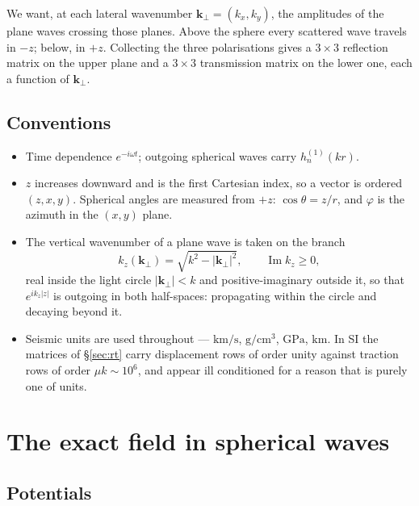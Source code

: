 \documentclass[11pt,a4paper]{article}
\newcommand{\bk}{\mathbf{k}}
\newcommand{\kperp}{\bk_\perp}
\begin{document}
We want, at each lateral wavenumber $\kperp = (k_x,k_y)$, the amplitudes of the
plane waves crossing those planes.  Above the sphere every scattered wave
travels in $-z$; below, in $+z$.  Collecting the three polarisations gives a
$3\times3$ reflection matrix on the upper plane and a $3\times3$ transmission
matrix on the lower one, each a function of $\kperp$.

\subsection{Conventions}\label{sec:conv}

\begin{itemize}
\item Time dependence $e^{-i\omega t}$; outgoing spherical waves carry
      $h_n^{(1)}(kr)$.
\item $z$ increases downward and is the first Cartesian index, so a vector is
      ordered $(z,x,y)$.  Spherical angles are measured from $+z$:
      $\cos\theta = z/r$, and $\varphi$ is the azimuth in the $(x,y)$ plane.
\item The vertical wavenumber of a plane wave is taken on the branch
      \begin{equation}\label{eq:branch}
        k_z(\kperp) = \sqrt{k^2 - |\kperp|^2}, \qquad \operatorname{Im}k_z \ge 0,
      \end{equation}
      real inside the light circle $|\kperp| < k$ and positive-imaginary outside
      it, so that $e^{i k_z |z|}$ is outgoing in both half-spaces: propagating
      within the circle and decaying beyond it.
\item Seismic units are used throughout --- $\mathrm{km/s}$,
      $\mathrm{g/cm^3}$, $\mathrm{GPa}$, $\mathrm{km}$.  In SI the matrices of
      \S\ref{sec:rt} carry displacement rows of order unity against traction
      rows of order $\mu k \sim 10^{6}$, and appear ill conditioned for a
      reason that is purely one of units.
\end{itemize}

\section{The exact field in spherical waves}\label{sec:mie}

\subsection{Potentials}
\end{document}
